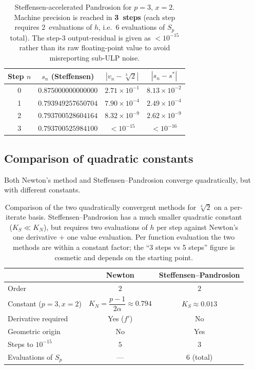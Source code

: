 \documentclass[11pt,a4paper]{article}
\theoremstyle{definition}
\newcommand{\cbrt}[1]{\sqrt[3]{#1}}
\begin{document}
\begin{table}[H]
\centering
\begin{tabular}{cccc}
\toprule
Step $n$ & $s_n$ (Steffensen) & $|v_n - \cbrt{2}|$ & $|s_n - s^*|$ \\
\midrule
0 & $0.875000000000000$ & $2.71 \times 10^{-1}$ & $8.13 \times 10^{-2}$ \\
1 & $0.793949257650704$ & $7.90 \times 10^{-4}$ & $2.49 \times 10^{-4}$ \\
2 & $0.793700528604164$ & $8.32 \times 10^{-9}$ & $2.62 \times 10^{-9}$ \\
3 & $0.793700525984100$ & $< 10^{-15}$ & $< 10^{-16}$ \\
\bottomrule
\end{tabular}
\caption{Steffensen-accelerated Pandrosion for $p=3$, $x=2$. Machine precision is reached in \textbf{3~steps} (each step requires 2~evaluations of $h$, i.e.\ 6 evaluations of $S_p$ total). The step-$3$ output-residual is given as $< 10^{-15}$ rather than its raw floating-point value to avoid misreporting sub-ULP noise.}
\end{table}

\subsection{Comparison of quadratic constants}

Both Newton's method and Steffensen--Pandrosion converge quadratically, but with different constants.

\begin{table}[H]
\centering
\renewcommand{\arraystretch}{1.3}
\begin{tabular}{lcc}
\toprule
& \textbf{Newton} & \textbf{Steffensen--Pandrosion} \\
\midrule
Order & $2$ & $2$ \\
Constant ($p\!=\!3, x\!=\!2$) & $K_N = \dfrac{p-1}{2\alpha} \approx 0.794$ & $K_S \approx 0.013$ \\
Derivative required & Yes ($f'$) & No \\
Geometric origin & No & Yes \\
Steps to $10^{-15}$ & $5$ & $3$ \\
Evaluations of $S_p$ & --- & $6$ (total) \\
\bottomrule
\end{tabular}
\caption{Comparison of the two quadratically convergent methods for $\cbrt{2}$ on a per-iterate basis. Steffensen--Pandrosion has a much smaller quadratic constant ($K_S \ll K_N$), but requires two evaluations of $h$ per step against Newton's one derivative + one value evaluation. Per function evaluation the two methods are within a constant factor; the ``3 steps vs 5 steps'' figure is cosmetic and depends on the starting point.}
\end{table}
\end{document}
